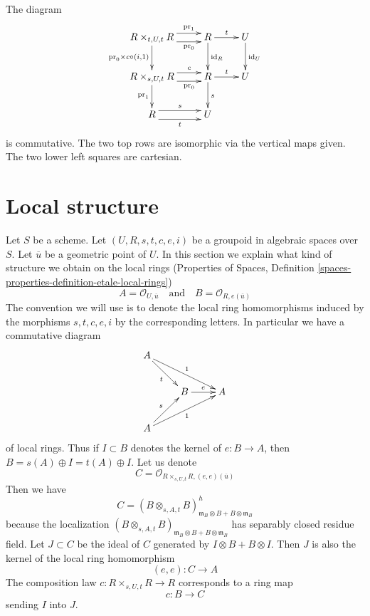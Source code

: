 \documentclass{stacks-project}
\theoremstyle{plain}
\theoremstyle{definition}
\theoremstyle{remark}
\numberwithin{equation}{subsection}
\begin{document}
\medskip\noindent
The diagram
\begin{equation}
\label{equation-pull}
\vcenter{
\xymatrix{
R \times_{t, U, t} R
\ar@<1ex>[r]^-{\text{pr}_1} \ar@<-1ex>[r]_-{\text{pr}_0}
\ar[d]_{\text{pr}_0 \times c \circ (i, 1)} &
R \ar[r]^t \ar[d]^{\text{id}_R} &
U \ar[d]^{\text{id}_U} \\
R \times_{s, U, t} R
\ar@<1ex>[r]^-c \ar@<-1ex>[r]_-{\text{pr}_0} \ar[d]_{\text{pr}_1} &
R \ar[r]^t \ar[d]^s &
U \\
R \ar@<1ex>[r]^s \ar@<-1ex>[r]_t &
U
}
}
\end{equation}
is commutative. The two top rows are isomorphic via the vertical maps given.
The two lower left squares are cartesian.






\section{Local structure}
\label{section-local}

\noindent
Let $S$ be a scheme.
Let $(U, R, s, t, c, e, i)$ be a groupoid in algebraic spaces over $S$.
Let $\overline{u}$ be a geometric point of $U$. In this section we explain what
kind of structure we obtain on the local rings
(Properties of Spaces, Definition
\ref{spaces-properties-definition-etale-local-rings})
$$
A = \mathcal{O}_{U, \overline{u}}
\quad\text{and}\quad
B = \mathcal{O}_{R, e(\overline{u})}
$$
The convention we will use is to denote the local ring homomorphisms
induced by the morphisms $s, t, c, e, i$ by the corresponding letters.
In particular we have a commutative diagram
$$
\xymatrix{
A \ar[rd]_t \ar[rrd]^1 \\
& B \ar[r]^e & A \\
A \ar[ru]^s \ar[rru]_1
}
$$
of local rings. Thus if $I \subset B$ denotes the kernel of $e : B \to A$,
then $B = s(A) \oplus I = t(A) \oplus I$. Let us denote
$$
C = \mathcal{O}_{R \times_{s, U, t} R, (e, e)(\overline{u})}
$$
Then we have
$$
C =
(B \otimes_{s, A, t} B)_{\mathfrak m_B \otimes B + B \otimes \mathfrak m_B}^h
$$
because the localization
$(B \otimes_{s, A, t} B)_{\mathfrak m_B \otimes B + B \otimes \mathfrak m_B}$
has separably closed residue field.
Let $J \subset C$ be the ideal of $C$ generated by $I \otimes B + B \otimes I$.
Then $J$ is also the kernel of the local ring homomorphism
$$
(e, e) : C \longrightarrow A
$$
The composition law $c : R \times_{s, U, t} R \to R$ corresponds to a
ring map
$$
c : B \longrightarrow C
$$
sending $I$ into $J$.
\end{document}
